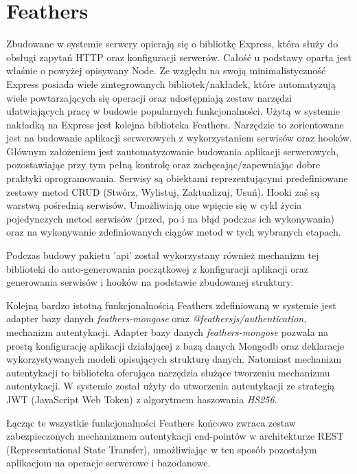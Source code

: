 \section{Feathers}
Zbudowane w systemie serwery opierają się o bibliotkę Express, która służy do obsługi zapytań HTTP oraz konfiguracji serwerów. Całość u podstawy oparta jest właśnie o powyżej opisywany Node. Ze względu na swoją minimalistyczność Express posiada wiele zintegrowanych bibliotek/nakładek, które automatyzują wiele powtarzających się operacji oraz udostępniają zestaw narzędzi ułatwiających pracę w budowie popularnych funkcjonalności. Użytą w systemie nakładką na Express jest kolejna biblioteka Feathers. Narzędzie to zorientowane jest na budowanie aplikacji serwerowych z wykorzystaniem serwisów oraz hooków. Głównym założeniem jest zautomatyzowanie budowania aplikacji serwerowych, pozostawiając przy tym pełną kontrolę oraz zachęcając/zapewniając dobre praktyki oprogramowania. Serwisy są obiektami reprezentującymi predefiniowane zestawy metod CRUD (Stwórz, Wylistuj, Zaktualizuj, Usuń). Hooki zaś są warstwą pośrednią serwisów. Umożliwiają one wpięcie się w cykl życia pojedynczych metod serwisów (przed, po i na błąd podczas ich wykonywania) oraz na wykonywanie zdefiniowanych ciągów metod w tych wybranych etapach.\cite{FeathersDocs}

Podczas budowy pakietu 'api' został wykorzystany również mechanizm tej biblioteki do auto-generowania początkowej z  konfiguracji aplikacji oraz generowania serwisów i hooków na podstawie zbudowanej struktury.

Kolejną bardzo istotną funkcjonalnością Feathers zdefiniowaną w systemie jest adapter bazy danych \textit{feathers-mongose} oraz \textit{@feathersjs/authentication}, mechanizm autentykacji. Adapter bazy danych \textit{feathers-mongose} pozwala na prostą konfigurację aplikacji działającej z bazą danych Mongodb oraz deklaracje wykorzystywanych modeli opisujących strukturę danych. Natomiast mechanizm autentykacji to biblioteka oferująca narzędzia służące tworzeniu mechanizmu autentykacji. W systemie został użyty do utworzenia autentykacji ze strategią JWT (JavaScript Web Token) z algorytmem haszowania \textit{HS256}. 

Łącząc te wszystkie funkcjonalności Feathers końcowo zwraca zestaw zabezpieczonych mechanizmem autentykacji end-pointów w architekturze REST (Representational State Transfer), umożliwiając w ten sposób pozostałym aplikacjom na operacje serwerowe i bazodanowe.

